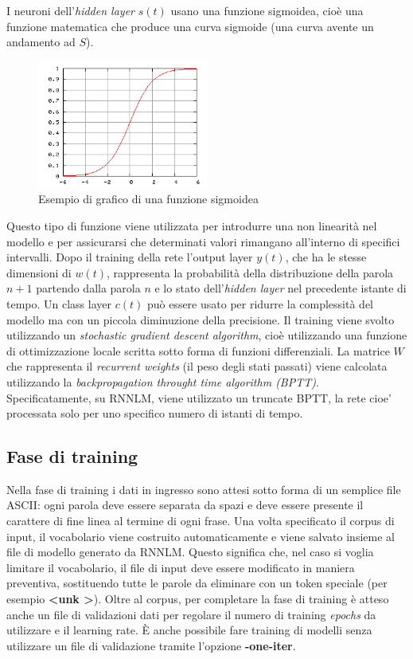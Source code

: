 \documentclass[a4paper,12pt,openright,twoside]{report}
\theoremstyle{definition}
\begin{document}
I neuroni dell'\emph{hidden layer} $s(t)$ usano una funzione sigmoidea, cioè una funzione matematica
che produce una curva sigmoide (una curva avente un andamento ad $S$).

\begin{figure}[ht]
  \centering
      \includegraphics[width=0.5\textwidth]{Immagini/sigmoide.png}
      \caption{Esempio di grafico di una funzione sigmoidea}
\label{fig:sigmoide}
\end{figure}

Questo tipo di funzione viene utilizzata per introdurre una non linearità nel modello e per
assicurarsi che determinati  valori rimangano all'interno di specifici intervalli.
Dopo il training della rete l'output layer $y(t)$, che ha le stesse dimensioni di $w(t)$,
rappresenta la probabilità della distribuzione della parola $n+1$ partendo dalla parola $n$ 
e lo stato dell'\emph{hidden layer} nel precedente istante di tempo.
Un class layer $c(t)$ può essere usato per ridurre la complessità del modello ma con un piccola
diminuzione della precisione.
Il training viene svolto utilizzando un \emph{stochastic gradient descent algorithm}, cioè utilizzando
una funzione di ottimizzazione locale scritta sotto forma di funzioni differenziali. La matrice $W$
che rappresenta il \emph{recurrent weights} (il peso degli stati passati) viene calcolata utilizzando la 
\emph{backpropagation throught time algorithm (BPTT)}.
Specificatamente, su RNNLM, viene utilizzato un truncate BPTT, la rete cioe' processata solo per uno specifico
numero di istanti di tempo.

\subsection{Fase di training}
Nella fase di training i dati in ingresso sono attesi sotto forma di un semplice file ASCII: ogni parola
deve essere separata da spazi e deve essere presente il carattere di
fine linea al termine di ogni frase.
Una volta specificato il corpus di input, il vocabolario viene costruito automaticamente e viene salvato insieme 
al file di modello generato da RNNLM.
Questo significa che, nel caso si voglia limitare il vocabolario, il file di input deve essere modificato in maniera
preventiva, sostituendo
tutte le parole da eliminare con un token speciale (per esempio \textbf{\textless unk \textgreater}).
Oltre al corpus, per completare la fase di training è atteso anche un
file di validazioni dati per regolare il numero di training \emph{epochs} da utilizzare e  il learning rate.
\`E anche possibile fare training di modelli senza utilizzare un file di validazione tramite l'opzione \textbf{-one-iter}.
\end{document}
